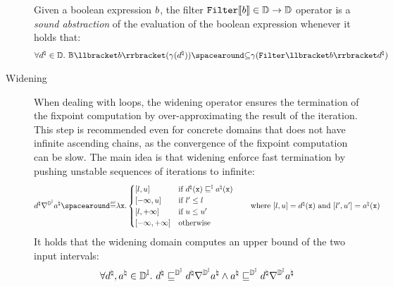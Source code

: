 \begin{description}
  \begin{definition}
    Given a boolean expression $b$, the filter $\textup{\texttt{Filter}} \llbracket b \rrbracket\in\mathbb{D}\to\mathbb{D}$ operator is a \emph{sound abstraction} of the evaluation of the boolean expression whenever it holds that:
  \begin{align*}
    \forall \defabstractvalue\in\abstractdomain.\spacer
    \bexpsemantics
    (\abstractdomainconcretization(\defabstractvalue))
    \SubseteQ
    \abstractdomainconcretization(\abstractdomainfilter \semanticsof{\defbexp}\defabstractvalue)
  \end{align*}
\end{definition}
  \item[Widening]
  When dealing with loops, the widening operator ensures the termination of the fixpoint computation by over-approximating the result of the iteration.
  This step is recommended even for concrete domains that does not have infinite ascending chains, as the convergence of the fixpoint computation can be slow.
  The main idea is that widening enforce fast termination by pushing unstable sequences of iterations to infinite:
  \begin{align*}
    \defabstractvalue \intervalabstractdomainwidening \defotherabstractvalue &\DefeQ \lambda \defvariable.\begin{cases}
      \interval{l}{u} & \text{if } \defabstractvalue(\defvariable) \intervalsubseteq \defotherabstractvalue(\defvariable) \\
      \interval{-\infty}{u} & \text{if } l' \le l \\
      \interval{l}{+\infty} & \text{if } u \le u' \\
      \intervaltop & \text{otherwise}
    \end{cases} \tag*{where $\interval{l}{u} = \defabstractvalue(\defvariable)$ and $\interval{l'}{u'} = \defotherabstractvalue(\defvariable)$}
  \end{align*}
  It holds that the widening domain computes an upper bound of the two input intervals:
  \begin{align*}
    \forall \defabstractvalue, \defotherabstractvalue \in \intervalabstractdomaintype.\spacer \defabstractvalue \intervalabstractdomainsubseteq \defabstractvalue \intervalabstractdomainwidening \defotherabstractvalue \land \defotherabstractvalue \intervalabstractdomainsubseteq \defabstractvalue \intervalabstractdomainwidening \defotherabstractvalue

\end{align*}
\end{description}
